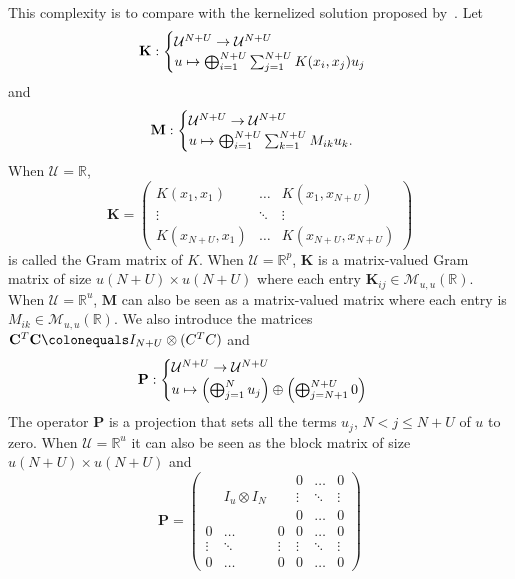 This complexity is to compare with the kernelized solution proposed by~\citet{minh2016unifying}. Let
\begin{dmath*}
\mathbf{K}:\begin{cases}
\mathcal{U}^{N+U} \to \mathcal{U}^{N+U} \\
u\mapsto\Vect_{i=1}^{N+U}\sum_{j=1}^{N+U}K(x_i, x_j)u_j
\end{cases}
\end{dmath*}
and
\begin{dmath*}
\mathbf{M}:\begin{cases}
\mathcal{U}^{N+U} \to \mathcal{U}^{N+U} \\
u\mapsto\Vect_{i=1}^{N+U}\sum_{k=1}^{N+U}M_{ik}u_k.
\end{cases}
\end{dmath*}
When $\mathcal{U}=\mathbb{R}$,
\begin{dmath*}
    \mathbf{K}=\begin{pmatrix} K(x_1, x_1) & \hdots & K(x_1, x_{N+U})
    \\ \vdots & \ddots & \vdots \\  K(x_{N+U}, x_1) & \hdots & K(x_{N+U}, x_{N+U}) \end{pmatrix}
\end{dmath*}
is called the Gram matrix of $K$. When $\mathcal{U}=\mathbb{R}^p$, $\mathbf{K}$ is a matrix-valued Gram matrix of size $u(N+U)\times u(N+U)$ where each entry $\mathbf{K}_{ij}\in\mathcal{M}_{u,u}(\mathbb{R})$. When $\mathcal{U}=\mathbb{R}^u$, $\mathbf{M}$ can also be seen as a matrix-valued matrix where each entry is $M_{ik}\in\mathcal{M}_{u,u}(\mathbb{R})$. We also introduce the matrices $\mathbf{C}^T \mathbf{C}\colonequals I_{N+U} \otimes (C^T C)$ and
\begin{dmath*}
\mathbf{P}:\begin{cases}
\mathcal{U}^{N+U} \to \mathcal{U}^{N+U} \\
u\mapsto \left(\Vect_{j=1}^Nu_j\right) \oplus \left(\Vect_{j=N+1}^{N+U}0\right)
\end{cases}
\end{dmath*}
The operator $\mathbf{P}$ is a projection that sets all the terms $u_j$, $N < j \le N + U$ of $u$ to zero. When $\mathcal{U}=\mathbb{R}^u$ it can also be seen as the block matrix of size $u(N+U) \times u(N + U)$ and
\begin{dmath*}
    \mathbf{P}=\begin{pmatrix}  & & & 0 & \hdots & 0 \\ & I_u \otimes I_{N} & & \vdots & \ddots & \vdots \\ & & & 0 & \hdots & 0 \\
    0 & \hdots & 0 & 0 & \hdots & 0 \\
    \vdots & \ddots & \vdots & \vdots & \ddots & \vdots \\
    0 & \hdots & 0 & 0 & \hdots & 0
    \end{pmatrix}
\end{dmath*}
